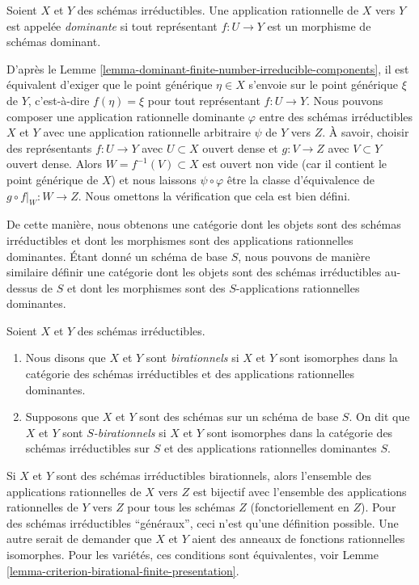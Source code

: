 \begin{definition}
\label{definition-dominant-rational}
Soient $X$ et $Y$ des schémas irréductibles. Une application rationnelle de $X$ vers
$Y$ est appelée {\it dominante} si tout représentant $f : U \to Y$ est un morphisme
de schémas dominant.
\end{definition}

\noindent
D'après le Lemme \ref{lemma-dominant-finite-number-irreducible-components}, il est équivalent d'exiger que le point générique
$\eta \in X$ s'envoie sur le point générique $\xi$ de $Y$,
c'est-à-dire $f(\eta) = \xi$ pour tout représentant $f : U \to Y$.
Nous pouvons composer une application rationnelle dominante $\varphi$ entre
des schémas irréductibles $X$ et $Y$ avec une application rationnelle
arbitraire $\psi$ de $Y$ vers
$Z$. À savoir, choisir des représentants $f : U \to Y$
avec $U \subset X$ ouvert dense et $g : V \to Z$ avec $V \subset Y$
ouvert dense. Alors $W = f^{-1}(V) \subset X$ est ouvert non vide (car il contient
le point générique de $X$) et nous laissons $\psi \circ \varphi$
être la classe d'équivalence de $g \circ f|_W : W \to Z$. Nous omettons la vérification
que cela est bien défini.

\medskip\noindent De cette
manière, nous obtenons une catégorie dont les objets sont des schémas irréductibles et dont les morphismes
sont des applications rationnelles dominantes. Étant donné un schéma de base $S$, nous pouvons
de manière similaire définir une catégorie dont les objets sont des schémas irréductibles au-dessus de $S$
et dont les morphismes sont des $S$-applications rationnelles dominantes.

\begin{definition}
\label{definition-birational-schemes}
Soient $X$ et $Y$ des schémas irréductibles.
\begin{enumerate}
\item Nous disons que $X$ et $Y$ sont {\it birationnels} si $X$ et $Y$
sont isomorphes dans la catégorie des schémas irréductibles et des applications rationnelles dominantes.
\item Supposons que $X$ et $Y$ sont des schémas sur un schéma de base $S$. On dit
que $X$ et $Y$ sont {\it $S$-birationnels} si $X$
et $Y$ sont isomorphes dans la catégorie des schémas irréductibles sur $S$ et des applications
rationnelles dominantes $S$.
\end{enumerate}
\end{definition}

\noindent
Si $X$ et $Y$ sont des schémas irréductibles birationnels, alors l'ensemble des applications
rationnelles de $X$ vers $Z$ est bijectif avec l'ensemble des applications rationnelles
de $Y$ vers $Z$ pour tous les schémas $Z$ (fonctoriellement en $Z$).
Pour des schémas irréductibles ``généraux'', ceci
n'est qu'une définition possible. Une autre serait de demander que $X$ et $Y$
aient des anneaux de fonctions rationnelles isomorphes.
Pour les variétés, ces conditions sont équivalentes, voir Lemme \ref{lemma-criterion-birational-finite-presentation}.


